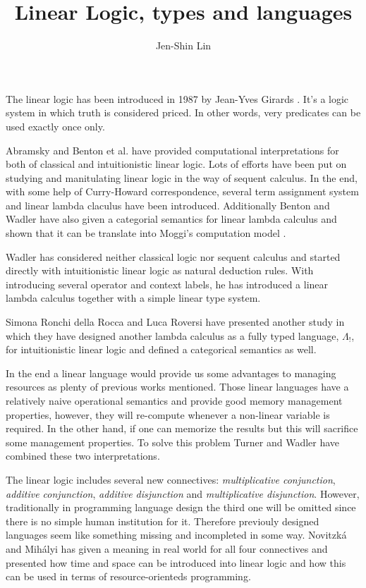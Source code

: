 \documentclass[a4paper]{article}
\title{Linear Logic, types and languages}
\author{Jen-Shin Lin}
\begin{document}
\maketitle

The linear logic has been introduced in 1987 by Jean-Yves Girards \cite{Girard87, Girard95}. It's a logic system in which truth is considered priced. In other words, very predicates can be used exactly once only.

Abramsky \cite{Abramsky92} and Benton et al. \cite{Benton92, Benton93} have provided computational interpretations for both of classical and intuitionistic linear logic. Lots of efforts have been put on studying and manitulating linear logic in the way of sequent calculus. In the end, with some help of Curry-Howard correspondence, several term assignment system and linear lambda claculus have been introduced. Additionally Benton and Wadler \cite{Benton95} have also given a categorial semantics for linear lambda calculus and shown that it can be translate into Moggi's computation model \cite{Moggi91}.

Wadler \cite{Wadler93} has considered neither classical logic nor sequent calculus and started directly with intuitionistic linear logic as natural deduction rules. With introducing several operator and context labels, he has introduced a linear lambda calculus together with a simple linear type system.

Simona Ronchi della Rocca and Luca Roversi \cite{Ronchi94} have presented another study in which they have designed another lambda calculus as a fully typed language, $\Lambda_{!}$, for intuitionistic linear logic and defined a categorical semantics as well.

In the end a linear language would provide us some advantages to managing resources as plenty of previous works mentioned. Those linear languages have a relatively naive operational semantics and provide good memory management properties, however, they will re-compute whenever a non-linear variable is required. In the other hand, if one can memorize the results but this will sacrifice some management properties. To solve this problem Turner and Wadler \cite{Turner98} have combined these two interpretations.

The linear logic includes several new connectives: \textit{multiplicative conjunction}, \textit{additive conjunction}, \textit{additive disjunction} and \textit{multiplicative disjunction}. However, traditionally in programming language design the third one will be omitted since there is no simple human institution for it. Therefore previouly designed languages seem like something missing and incompleted in some way. Novitzká and Mihályi \cite{Novitzka07} has given a meaning in real world for all four connectives and presented how time and space can be introduced into linear logic and how this can be used in terms of resource-orienteds programming.
\end{document}
